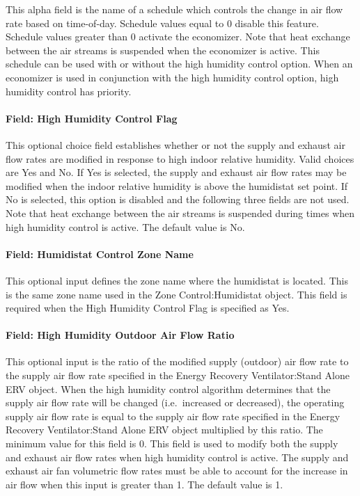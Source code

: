 This alpha field is the name of a schedule which controls the change in air flow rate based on time-of-day. Schedule values equal to 0 disable this feature. Schedule values greater than 0 activate the economizer. Note that heat exchange between the air streams is suspended when the economizer is active. This schedule can be used with or without the high humidity control option. When an economizer is used in conjunction with the high humidity control option, high humidity control has priority.

\paragraph{Field: High Humidity Control Flag}\label{field-high-humidity-control-flag}

This optional choice field establishes whether or not the supply and exhaust air flow rates are modified in response to high indoor relative humidity. Valid choices are Yes and No. If Yes is selected, the supply and exhaust air flow rates may be modified when the indoor relative humidity is above the humidistat set point. If No is selected, this option is disabled and the following three fields are not used. Note that heat exchange between the air streams is suspended during times when high humidity control is active. The default value is No.

\paragraph{Field: Humidistat Control Zone Name}\label{field-humidistat-control-zone-name-1}

This optional input defines the zone name where the humidistat is located. This is the same zone name used in the Zone Control:Humidistat object. This field is required when the High Humidity Control Flag is specified as Yes.

\paragraph{Field: High Humidity Outdoor Air Flow Ratio}\label{field-high-humidity-outdoor-air-flow-ratio-1}

This optional input is the ratio of the modified supply (outdoor) air flow rate to the supply air flow rate specified in the Energy Recovery Ventilator:Stand Alone ERV object. When the high humidity control algorithm determines that the supply air flow rate will be changed (i.e.~increased or decreased), the operating supply air flow rate is equal to the supply air flow rate specified in the Energy Recovery Ventilator:Stand Alone ERV object multiplied by this ratio. The minimum value for this field is 0. This field is used to modify both the supply and exhaust air flow rates when high humidity control is active. The supply and exhaust air fan volumetric flow rates must be able to account for the increase in air flow when this input is greater than 1. The default value is 1.

